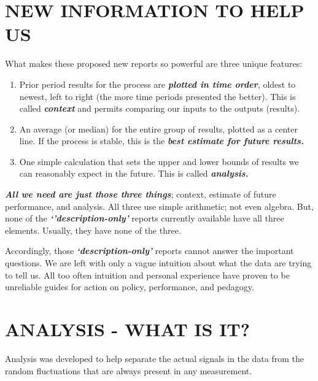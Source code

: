 \documentclass[
  letterpaper,
  DIV=11,
  numbers=noendperiod]{scrartcl}
\begin{document}
\section{\texorpdfstring{\textbf{NEW INFORMATION TO HELP
US}}{NEW INFORMATION TO HELP US}}\label{new-information-to-help-us}

What makes these proposed new reports so powerful are three unique
features:

\begin{enumerate}
\def\labelenumi{\arabic{enumi}.}
\item
  Prior period results for the process are \textbf{\emph{plotted in time
  order}}, oldest to newest, left to right (the more time periods
  presented the better). This is called \textbf{\emph{context}} and
  permits comparing our inputs to the outputs (results).
\item
  An average (or median) for the entire group of results, plotted as a
  center line. If the process is stable, this is the \textbf{\emph{best
  estimate for future results.}}
\item
  One simple calculation that sets the upper and lower bounds of results
  we can reasonably expect in the future. This is called
  \textbf{\emph{analysis.}}
\end{enumerate}

\textbf{\emph{All we need are just those three things}}; context,
estimate of future performance, and analysis. All three use simple
arithmetic; not even algebra. But, none of the
\textbf{\emph{`'description-only'}} reports currently available have all
three elements. Usually, they have none of the three.

Accordingly, those \textbf{\emph{`description-only'}} reports cannot
answer the important questions. We are left with only a vague intuition
about what the data are trying to tell us. All too often intuition and
personal experience have proven to be unreliable guides for action on
policy, performance, and pedagogy.

\vspace{0.3in}

\section{\texorpdfstring{\textbf{ANALYSIS - WHAT IS
IT?}}{ANALYSIS - WHAT IS IT?}}\label{analysis---what-is-it}

Analysis was developed to help separate the actual signals in the data
from the random fluctuations that are always present in any measurement.
\end{document}
